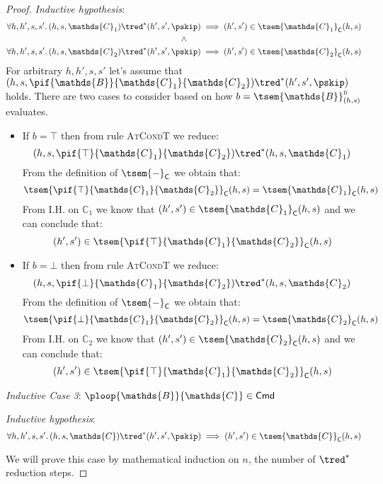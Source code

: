 \begin{lem}
{\begin{proof}
	\textit{Inductive hypothesis}:
	\begin{gather*}
		\forall h, h', s, s' \ldotp
		(h, s, \mathds{C}_1) \tred^* (h', s', \pskip)
		\implies
		(h', s') \in \tsem{\mathds{C}_1}_\mathsf{C}(h, s) \\
		\land \\
		\forall h, h', s, s' \ldotp
		(h, s, \mathds{C}_2) \tred^* (h', s', \pskip)
		\implies
		(h', s') \in \tsem{\mathds{C}_2}_\mathsf{C}(h, s)
	\end{gather*}
	For arbitrary $h, h', s, s'$ let's assume that $(h, s, \pif{\mathds{B}}{\mathds{C}_1}{\mathds{C}_2}) \tred^* (h', s', \pskip)$ holds. There are two cases to consider based on how $b = \tsem{\mathds{B}}^\textsc{b}_{(h, s)}$ evaluates.
	\begin{itemize}
		\item If $b = \top$ then from rule \textsc{AtCondT} we reduce:
			\[
				(h, s, \pif{\top}{\mathds{C}_1}{\mathds{C}_2}) \tred^* (h, s, \mathds{C}_1)
			\]
			From the definition of $\tsem{-}_\mathsf{C}$ we obtain that:
			\[
				\tsem{\pif{\top}{\mathds{C}_1}{\mathds{C}_2}}_\mathsf{C}(h, s) = \tsem{\mathds{C}_1}_\mathsf{C}(h,s)
			\]
			From I.H. on $\mathds{C}_1$ we know that $(h', s') \in \tsem{\mathds{C}_1}_\mathsf{C}(h, s)$ and we can conclude that:
			\[
				(h', s') \in \tsem{\pif{\top}{\mathds{C}_1}{\mathds{C}_2}}_\mathsf{C}(h, s)
			\]
		
		\item If $b = \bot$ then from rule \textsc{AtCondT} we reduce:
			\[
				(h, s, \pif{\bot}{\mathds{C}_1}{\mathds{C}_2}) \tred^* (h, s, \mathds{C}_2)
			\]
			From the definition of $\tsem{-}_\mathsf{C}$ we obtain that:
			\[
				\tsem{\pif{\bot}{\mathds{C}_1}{\mathds{C}_2}}_\mathsf{C}(h, s) = \tsem{\mathds{C}_2}_\mathsf{C}(h,s)
			\]
			From I.H. on $\mathds{C}_2$ we know that $(h', s') \in \tsem{\mathds{C}_2}_\mathsf{C}(h, s)$ and we can conclude that:
			\[
				(h', s') \in \tsem{\pif{\top}{\mathds{C}_1}{\mathds{C}_2}}_\mathsf{C}(h, s)
			\]
	\end{itemize}
	
	\textit{Inductive Case 3}: $\ploop{\mathds{B}}{\mathds{C}} \in \mathsf{Cmd}$
	
	\textit{Inductive hypothesis}:
	\[
		\forall h, h', s, s' \ldotp
		(h, s, \mathds{C}) \tred^* (h', s', \pskip)
		\implies
		(h', s') \in \tsem{\mathds{C}}_\mathsf{C}(h, s)
	\]
	
	We will prove this case by mathematical induction on $n$, the number of $\tred^*$ reduction steps.
	

\end{proof}}
\end{lem}
